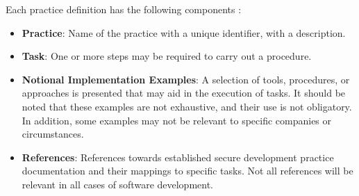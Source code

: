 Each practice definition has the following components \cite{ssdf}:
\begin{itemize}
  \item \textbf{Practice}: Name of the practice with a unique identifier, with a description. 
  \item \textbf{Task}: One or more steps may be required to carry out a procedure.
  \item \textbf{Notional Implementation Examples}: A selection of tools, procedures, or approaches is presented that may aid in the execution of tasks. It should be noted that these examples are not exhaustive, and their use is not obligatory. In addition, some examples may not be relevant to specific companies or circumstances.
  \item \textbf{References}: References towards established secure development practice documentation and their mappings to specific tasks. Not all references will be relevant in all cases of software development. 
\end{itemize}